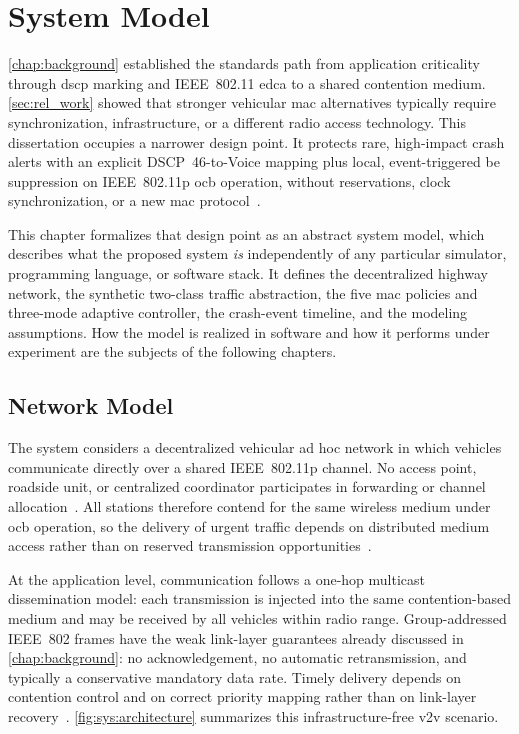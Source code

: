 \chapter{System Model}
\label{chap:sysmodel}

\autoref{chap:background} established the standards path from application criticality through \gls{dscp} marking and IEEE~802.11 \gls{edca} to a shared contention medium.
\autoref{sec:rel_work} showed that stronger vehicular \gls{mac} alternatives typically require synchronization, infrastructure, or a different radio access technology.
This dissertation occupies a narrower design point.
It protects rare, high-impact crash alerts with an explicit DSCP~46-to-Voice mapping plus local, event-triggered \gls{be} suppression on IEEE~802.11p \gls{ocb} operation, without reservations, clock synchronization, or a new \gls{mac} protocol~\cite{jiang2008ieee80211p,IEEE80211,RFC8325_WiFi_QoS}.

This chapter formalizes that design point as an abstract system model, which describes what the proposed system \emph{is} independently of any particular simulator, programming language, or software stack.
It defines the decentralized highway network, the synthetic two-class traffic abstraction, the five \gls{mac} policies and three-mode adaptive controller, the crash-event timeline, and the modeling assumptions.
How the model is realized in software and how it performs under experiment are the subjects of the following chapters.

\section{Network Model}
\label{sec:sys:network}

The system considers a decentralized vehicular ad hoc network in which vehicles communicate directly over a shared IEEE~802.11p channel.
No access point, roadside unit, or centralized coordinator participates in forwarding or channel allocation~\cite{jiang2008ieee80211p}.
All stations therefore contend for the same wireless medium under \gls{ocb} operation, so the delivery of urgent traffic depends on distributed medium access rather than on reserved transmission opportunities~\cite{IEEE80211,etsi_en_302663}.

At the application level, communication follows a one-hop multicast dissemination model: each transmission is injected into the same contention-based medium and may be received by all vehicles within radio range.
Group-addressed IEEE~802 frames have the weak link-layer guarantees already discussed in \autoref{chap:background}: no acknowledgement, no automatic retransmission, and typically a conservative mandatory data rate. Timely delivery depends on contention control and on correct priority mapping rather than on link-layer recovery~\cite{RFC9119_Multicast_IEEE802_Wireless}.
\autoref{fig:sys:architecture} summarizes this infrastructure-free \gls{v2v} scenario.

